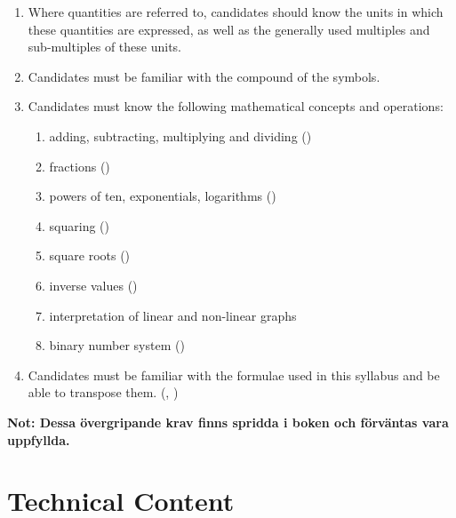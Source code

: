 \begin{enumerate}[label=\alph*]
\item Where quantities are referred to, candidates should know the units in
  which these quantities are expressed, as well as the generally used multiples
  and sub-multiples of these units.
\item Candidates must be familiar with the compound of the symbols.
\item Candidates must know the following mathematical concepts and operations:
\begin{enumerate}
\item adding, subtracting, multiplying and dividing ()\label{HAREC.I.c.1}
\item fractions ()\label{HAREC.I.c.2}
\item powers of ten, exponentials, logarithms ()\label{HAREC.I.c.3}
\item squaring ()\label{HAREC.I.c.4}
\item square roots ()\label{HAREC.I.c.5}
\item inverse values ()\label{HAREC.I.c.6}
\item interpretation of linear and non-linear graphs
\item binary number system ()\label{HAREC.I.c.8}
\end{enumerate}
\item Candidates must be familiar with the formulae used in this syllabus and
  be able to transpose them. (, )\label{HAREC.I.d}
\end{enumerate}

\textbf{Not: Dessa övergripande krav finns spridda i boken och förväntas vara
uppfyllda.}

\section{Technical Content}

\makeatletter
\renewcommand{\labelenumi}{\theenumi.}

\renewcommand{\theenumii}{\arabic{enumii}}
\renewcommand{\labelenumii}{\theenumi.\theenumii}
\renewcommand{\p@enumii}{\theenumi.}

\renewcommand{\theenumiii}{\arabic{enumiii}}
\renewcommand{\labelenumiii}{\theenumi.\theenumii.\theenumiii}
\renewcommand{\p@enumiii}{\theenumi.\theenumii.}

